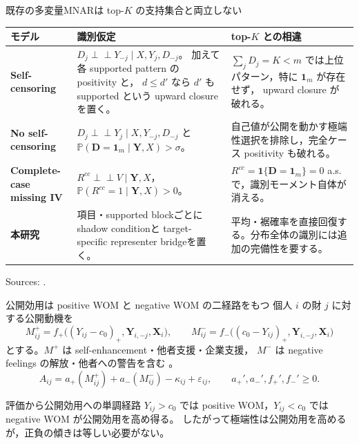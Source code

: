 \documentclass[aspectratio=169,10pt]{beamer}
\newcommand{\Prb}{\mathbb{P}}
\newcommand{\1}{\mathbf{1}}
\newcommand{\indep}{\mathrel{\perp\!\!\!\perp}}
\newcommand{\Y}{\bm{Y}}
\newcommand{\X}{\bm{X}}
\newcommand{\D}{\bm{D}}
\begin{document}
\begin{frame}[shrink=5]{既存の多変量MNARは top-$K$ の支持集合と両立しない}
\scriptsize
\begin{tabular}{>{\raggedright\arraybackslash}p{}
                >{\raggedright\arraybackslash}p{}
                >{\raggedright\arraybackslash}p{}}
\toprule
モデル & 識別仮定 & top-$K$ との相違 \\
\midrule
\textbf{Self-censoring}
&
$D_j\indep Y_{-j}\mid X,Y_j,D_{-j}$。
加えて各 supported pattern の positivity と，
$d\le d'$ なら $d'$ も supported という upward closure を置く。
&
$\sum_jD_j=K<m$ では上位パターン，特に $\bm1_m$ が存在せず，
upward closure が破れる。
\\
\addlinespace
\textbf{No self-censoring}
&
$D_j\indep Y_j\mid X,Y_{-j},D_{-j}$ と
$\Prb(\D=\bm1_m\mid\Y,X)>\sigma$。
&
自己値が公開を動かす極端性選択を排除し，完全ケース positivity も破れる。
\\
\addlinespace
\textbf{Complete-case missing IV}
&
$R^{cc}\indep V\mid\Y,X$，
$\Prb(R^{cc}=1\mid\Y,X)>0$。
&
$R^{cc}=\1\{\D=\bm1_m\}=0$ a.s. で，識別モーメント自体が消える。
\\
\addlinespace
\textbf{本研究}
&
項目・supported blockごとにshadow conditionと
target-specific representer bridgeを置く。
&
平均・裾確率を直接回復する。分布全体の識別には追加の完備性を要する。
\\
\bottomrule
\end{tabular}
\vspace{1mm}
{\tiny Sources: \textcite{LiMiaoShpitserTchetgen2023,MalinskyShpitserTchetgen2022,dHaultfoeuille2010}.}
\end{frame}

\begin{frame}{公開効用は positive WOM と negative WOM の二経路をもつ}
個人 $i$ の財 $j$ に対する公開動機を
\[
M^+_{ij}=f_+\bigl((Y_{ij}-c_0)_+,\Y_{i,-j},\X_i\bigr),
\qquad
M^-_{ij}=f_-\bigl((c_0-Y_{ij})_+,\Y_{i,-j},\X_i\bigr)
\]
とする。$M^+$ は self-enhancement・他者支援・企業支援，
$M^-$ は negative feelings の解放・他者への警告を含む
\parencite{HennigThurauEtAl2004,Berger2014}。
\[
A_{ij}
=a_+(M^+_{ij})+a_-(M^-_{ij})-\kappa_{ij}+\varepsilon_{ij},
\qquad a_+',a_-',f_+',f_-'\ge0.
\tag{U}
\]
\begin{block}{評価から公開効用への単調経路}
$Y_{ij}>c_0$ では positive WOM，$Y_{ij}<c_0$ では negative WOM が公開効用を高め得る。
したがって極端性は公開効用を高めるが，正負の傾きは等しい必要がない。
\end{block}
\end{frame}
\end{document}
